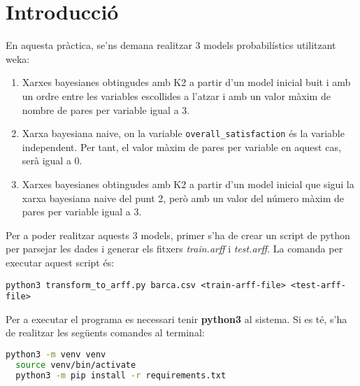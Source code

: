 \documentclass[../informe.tex]{subfiles}
\begin{document}
    \section{Introducció}
    En aquesta pràctica, se'ns demana realitzar 3 models probabilístics utilitzant weka:
    \begin{enumerate}
        \item Xarxes bayesianes obtingudes amb K2 a partir d'un model inicial buit i amb un ordre entre les variables escollides a l'atzar i amb un valor màxim de nombre de pares per variable igual a 3.
        \item Xarxa bayesiana naive, on la variable \texttt{overall\_satisfaction} és la variable independent. Per tant, el valor màxim de pares per variable en aquest cas, serà igual a 0.
        \item Xarxes bayesianes obtingudes amb K2 a partir d'un model inicial que sigui la xarxa bayesiana naive del punt 2, però amb un valor del número màxim de pares per variable igual a 3.
    \end{enumerate}
    Per a poder realitzar aquests 3 models, primer s'ha de crear un script de python per parsejar les dades i generar els fitxers \emph{train.arff} i \emph{test.arff}. La comanda per executar aquest script és:
    \begin{Verbatim}[fontsize=\small]
   python3 transform_to_arff.py barca.csv <train-arff-file> <test-arff-file>
    \end{Verbatim}
    Per a executar el programa es necessari tenir \textbf{python3} al sistema. Si es té, s'ha de realitzar les següents comandes al terminal:
    \begin{lstlisting}[language=bash]
  python3 -m venv venv
  source venv/bin/activate
  python3 -m pip install -r requirements.txt
    \end{lstlisting}
\end{document}
